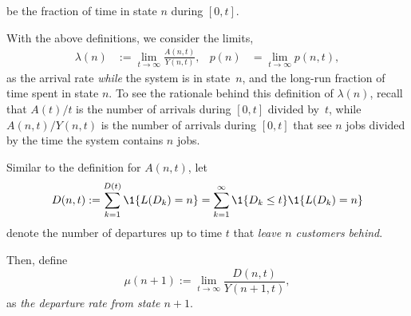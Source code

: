 be the fraction of time in state $n$ during $[0,t]$.



With the above definitions, we consider the limits,
\begin{align}\label{eq:p(n)}
 \lambda(n) &:= \lim_{t\to\infty} \frac{A(n,t)}{Y(n,t)}, &p(n) &=\lim_{t\to\infty} p(n,t),
\end{align}
as the arrival rate \emph{while} the system is in state~$n$, and the long-run fraction of time spent in state $n$.
To see the rationale behind this definition of $\lambda(n)$, recall that $A(t)/t$ is  the number of arrivals during $[0,t]$ divided by~$t$, while  $A(n,t)/Y(n,t)$ is the number of arrivals during $[0,t]$ that see $n$ jobs divided by the time the system contains $n$ jobs.


Similar to the definition for $A(n,t)$, let
\begin{equation}\label{eq:102}
 D(n,t) := \sum_{k=1}^{D(t)} \1{\L(D_k) = n}  = \sum_{k=1}^\infty \1{D_k \leq t} \1{\L(D_k) = n}
 \end{equation}
 denote the number of departures up to time $t$ that\emph{ leave $n$
 customers behind}.
\begin{marginfigure}%
\end{marginfigure}
Then, define
\begin{equation*}
 \mu(n+1) := \lim_{t\to\infty} \frac{D(n,t)}{Y(n+1,t)},
\end{equation*}
as \emph{ the departure rate from state $n+1$}.

